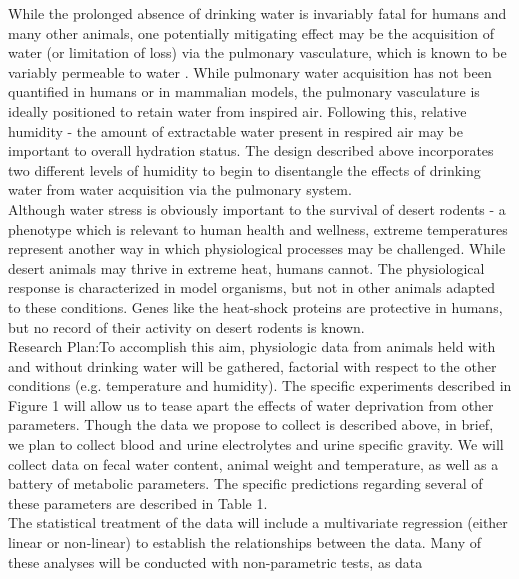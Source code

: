 \documentclass[11pt]{article}
\begin{document}
While the prolonged absence of drinking water is invariably fatal for humans and many other animals, one potentially mitigating effect may be the acquisition of water (or limitation of loss) via the pulmonary vasculature, which is known to be variably permeable to water \citep{Berger:2011ks,Goralski:2010eo}. While pulmonary water acquisition has not been quantified in humans or in mammalian models, the pulmonary vasculature is ideally positioned to retain water from inspired air. Following this, relative humidity -  the amount of extractable water present in respired air may be important to overall hydration status. The design described above incorporates two different levels of humidity to begin to disentangle the effects of drinking water from water acquisition via the pulmonary system. \\
  

Although water stress is obviously important to the survival of desert rodents - a phenotype which is relevant to human health and wellness, extreme temperatures represent another way in which physiological processes may be challenged. While desert animals may thrive in extreme heat, humans cannot. The physiological response is characterized in model organisms, but not in other animals adapted to these conditions. Genes like the heat-shock proteins are protective in humans, but no record of their activity on desert rodents is known. \\

Research Plan:To accomplish this aim, physiologic data from animals held with and without drinking water will be gathered, factorial with respect to the other conditions (e.g. temperature and humidity). The specific experiments described in \hypertarget{Figure 1}{Figure 1} will allow us to tease apart the effects of water deprivation from other parameters. Though the data we propose to collect is described above, in brief, we plan to collect blood and urine electrolytes and urine specific gravity. We will collect data on fecal water content, animal weight and temperature, as well as a battery of metabolic parameters. The specific predictions regarding several of these parameters are described in Table 1.  \\

The statistical treatment of the data will include a multivariate regression (either linear or non-linear) to establish the relationships between the data. Many of these analyses will be conducted with non-parametric tests, as data 
\end{document}

